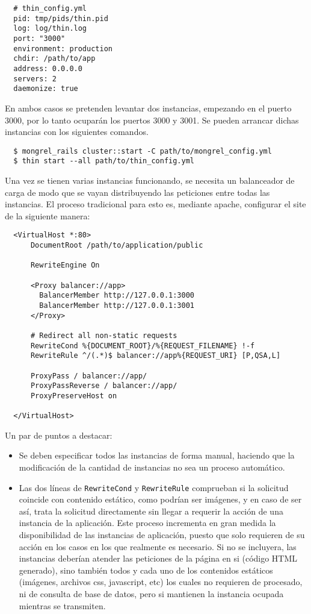 \begin{verbatim}
  # thin_config.yml
  pid: tmp/pids/thin.pid
  log: log/thin.log
  port: "3000"
  environment: production
  chdir: /path/to/app
  address: 0.0.0.0
  servers: 2
  daemonize: true
\end{verbatim}

En ambos casos se pretenden levantar dos instancias, empezando en el puerto 3000, por lo tanto ocuparán los puertos 3000 y 3001. Se pueden arrancar dichas instancias con los siguientes comandos.

\begin{verbatim}
  $ mongrel_rails cluster::start -C path/to/mongrel_config.yml
  $ thin start --all path/to/thin_config.yml
\end{verbatim}

Una vez se tienen varias instancias funcionando, se necesita un balanceador de carga de modo que se vayan distribuyendo las peticiones entre todas las instancias. El proceso tradicional para esto es, mediante apache, configurar el site de la siguiente manera:

\begin{verbatim}
  <VirtualHost *:80>
      DocumentRoot /path/to/application/public
      
      RewriteEngine On
      
      <Proxy balancer://app>
        BalancerMember http://127.0.0.1:3000
        BalancerMember http://127.0.0.1:3001
      </Proxy>
      
      # Redirect all non-static requests
      RewriteCond %{DOCUMENT_ROOT}/%{REQUEST_FILENAME} !-f
      RewriteRule ^/(.*)$ balancer://app%{REQUEST_URI} [P,QSA,L]

      ProxyPass / balancer://app/
      ProxyPassReverse / balancer://app/
      ProxyPreserveHost on
      
  </VirtualHost>
\end{verbatim}

Un par de puntos a destacar:

\begin{itemize}
  \item Se deben especificar todos las instancias de forma manual, haciendo que la modificación de la cantidad de instancias no sea un proceso automático.
  \item Las dos líneas de \texttt{RewriteCond} y \texttt{RewriteRule} comprueban si la solicitud coincide con contenido estático, como podrían ser imágenes, y en caso de ser así, trata la solicitud directamente sin llegar a requerir la acción de una instancia de la aplicación. Este proceso incrementa en gran medida la disponibilidad de las instancias de aplicación, puesto que solo requieren de su acción en los casos en los que realmente es necesario. Si no se incluyera, las instancias deberían atender las peticiones de la página en si (código HTML generado), sino también todos y cada uno de los contenidos estáticos (imágenes, archivos css, javascript, etc) los cuales no requieren de procesado, ni de consulta de base de datos, pero si mantienen la instancia ocupada mientras se transmiten.
\end{itemize}


